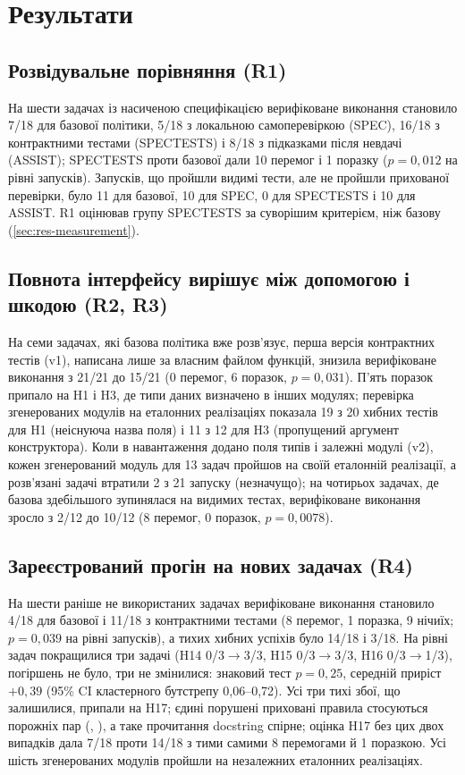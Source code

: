\documentclass[11pt]{article}
\begin{document}
\section{Результати}\label{sec:results}

\subsection{Розвідувальне порівняння (R1)}\label{sec:res-r1}
На шести задачах із насиченою специфікацією верифіковане виконання становило 7/18 для базової політики, 5/18 з локальною самоперевіркою (SPEC), 16/18 з контрактними тестами (SPECTESTS) і 8/18 з підказками після невдачі (ASSIST); SPECTESTS проти базової дали 10 перемог і 1 поразку ($p=0{,}012$ на рівні запусків). Запусків, що пройшли видимі тести, але не пройшли прихованої перевірки, було 11 для базової, 10 для SPEC, 0 для SPECTESTS і 10 для ASSIST. R1 оцінював групу SPECTESTS за суворішим критерієм, ніж базову (\cref{sec:res-measurement}).

\subsection{Повнота інтерфейсу вирішує між допомогою і шкодою (R2, R3)}\label{sec:res-interface}
На семи задачах, які базова політика вже розв'язує, перша версія контрактних тестів (v1), написана лише за власним файлом функцій, знизила верифіковане виконання з 21/21 до 15/21 (0 перемог, 6 поразок, $p=0{,}031$). П'ять поразок припало на H1 і H3, де типи даних визначено в інших модулях; перевірка згенерованих модулів на еталонних реалізаціях показала 19 з 20 хибних тестів для H1 (неіснуюча назва поля) і 11 з 12 для H3 (пропущений аргумент конструктора). Коли в навантаження додано поля типів і залежні модулі (v2), кожен згенерований модуль для 13 задач пройшов на своїй еталонній реалізації, а розв'язані задачі втратили 2 з 21 запуску (незначущо); на чотирьох задачах, де базова здебільшого зупинялася на видимих тестах, верифіковане виконання зросло з 2/12 до 10/12 (8 перемог, 0 поразок, $p=0{,}0078$).

\subsection{Зареєстрований прогін на нових задачах (R4)}\label{sec:res-r4}
На шести раніше не використаних задачах верифіковане виконання становило 4/18 для базової і 11/18 з контрактними тестами (8 перемог, 1 поразка, 9 нічиїх; $p=0{,}039$ на рівні запусків), а тихих хибних успіхів було 14/18 і 3/18. На рівні задач покращилися три задачі (H14 0/3$\to$3/3, H15 0/3$\to$3/3, H16 0/3$\to$1/3), погіршень не було, три не змінилися: знаковий тест $p=0{,}25$, середній приріст $+0{,}39$ (95\% CI кластерного бутстрепу 0{,}06--0{,}72). Усі три тихі збої, що залишилися, припали на H17; єдині порушені приховані правила стосуються порожніх пар (, ), а таке прочитання docstring спірне; оцінка H17 без цих двох випадків дала 7/18 проти 14/18 з тими самими 8 перемогами й 1 поразкою. Усі шість згенерованих модулів пройшли на незалежних еталонних реалізаціях.
\end{document}
